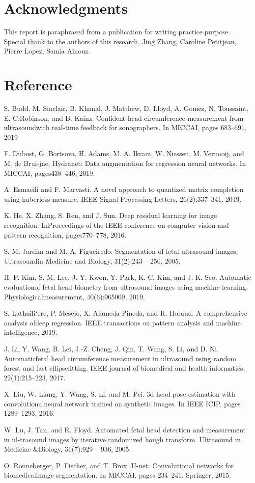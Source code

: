\documentclass{article}
\begin{document}
\section{Acknowledgments} 
This report is paraphrased from a  publication for writing practice purpose. Special thank to the authors of this research, Jing Zhang, Caroline Petitjean, Pierre Lopez, Samia Ainouz. 

\section{Reference}
S. Budd, M. Sinclair, B. Khanal, J. Matthew, D. Lloyd, A. Gomez, N. Toussaint, E. C.Robinson, and B. Kainz. Conﬁdent head circumference measurement from ultrasoundwith real-time feedback for sonographers. In MICCAI, pages 683–691, 2019

F. Dubost, G. Bortsova, H. Adams, M. A. Ikram, W. Niessen, M. Vernooij, and M. de Brui-jne. Hydranet: Data augmentation for regression neural networks. In MICCAI, pages438–446, 2019.

A. Esmaeili and F. Marvasti. A novel approach to quantized matrix completion using huberloss measure. IEEE Signal Processing Letters, 26(2):337–341, 2019.

K. He, X. Zhang, S. Ren, and J. Sun. Deep residual learning for image recognition. InProceedings of the IEEE conference on computer vision and pattern recognition, pages770–778, 2016.

S. M. Jardim and M. A. Figueiredo. Segmentation of fetal ultrasound images. Ultrasoundin Medicine and Biology, 31(2):243 – 250, 2005.

H. P. Kim, S. M. Lee, J.-Y. Kwon, Y. Park, K. C. Kim, and J. K. Seo. Automatic evaluationof fetal head biometry from ultrasound images using machine learning. Physiologicalmeasurement, 40(6):065009, 2019.

S. Lathuili`ere, P. Mesejo, X. Alameda-Pineda, and R. Horaud. A comprehensive analysis ofdeep regression. IEEE transactions on pattern analysis and machine intelligence, 2019.

J. Li, Y. Wang, B. Lei, J.-Z. Cheng, J. Qin, T. Wang, S. Li, and D. Ni. Automaticfetal head circumference measurement in ultrasound using random forest and fast ellipseﬁtting. IEEE journal of biomedical and health informatics, 22(1):215–223, 2017.

X. Liu, W. Liang, Y. Wang, S. Li, and M. Pei. 3d head pose estimation with convolutionalneural network trained on synthetic images. In IEEE ICIP, pages 1289–1293, 2016.

W. Lu, J. Tan, and R. Floyd. Automated fetal head detection and measurement in ul-trasound images by iterative randomized hough transform. Ultrasound in Medicine \&Biology, 31(7):929 – 936, 2005.

O. Ronneberger, P. Fischer, and T. Brox. U-net: Convolutional networks for biomedicalimage segmentation. In MICCAI, pages 234–241. Springer, 2015.
\end{document}

